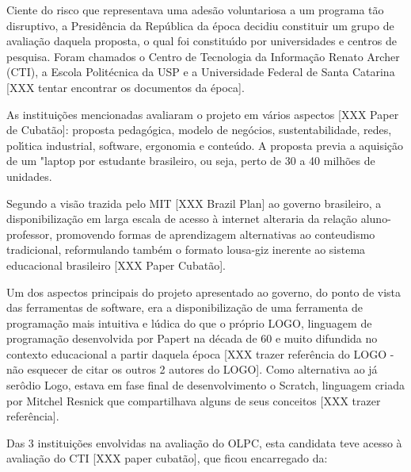 \documentclass[
12pt,		%
openright,	%
twoside,  %
a4paper,			%
chapter=TITLE,		%
english,			%
french,				%
spanish,			%
brazil				%
]{USPSC-classe/USPSC}
\begin{document}
Ciente do risco que representava uma ades\~ao voluntariosa a um programa t\~ao disruptivo, a Presid\^encia da Rep\'ublica da \'epoca decidiu constituir um grupo de avalia\c{c}\~ao  daquela proposta, o  qual foi constitu\'{\i}do por universidades e centros de pesquisa. Foram chamados o Centro de Tecnologia da Informa\c{c}\~ao Renato Archer (CTI), a Escola Polit\'ecnica da USP e a Universidade Federal de Santa Catarina [XXX tentar encontrar os documentos da \'epoca]. 




As institui\c{c}\~oes mencionadas avaliaram o projeto em v\'arios aspectos [XXX Paper de Cubat\~ao]: proposta pedag\'ogica, modelo de neg\'ocios, sustentabilidade, redes, pol\'{\i}tica industrial, software, ergonomia e conte\'udo. A proposta previa a aquisi\c{c}\~ao de um "laptop por estudante brasileiro, ou seja, perto de 30 a 40 milh\~oes de unidades.




Segundo a vis\~ao trazida pelo MIT [XXX Brazil Plan] ao governo brasileiro, a disponibiliza\c{c}\~ao em larga escala de acesso \`a internet alteraria da rela\c{c}\~ao aluno-professor, promovendo formas de aprendizagem alternativas ao conteudismo tradicional, reformulando tamb\'em o formato lousa-giz inerente ao sistema educacional brasileiro [XXX Paper Cubat\~ao].




Um dos aspectos principais do projeto apresentado ao governo, do ponto de vista das ferramentas de software, era a disponibiliza\c{c}\~ao de uma ferramenta de programa\c{c}\~ao mais intuitiva e l\'udica do que o pr\'oprio LOGO, linguagem de programa\c{c}\~ao desenvolvida por Papert na d\'ecada de 60 e muito difundida no contexto educacional a partir daquela \'epoca [XXX trazer refer\^encia do LOGO - n\~ao esquecer de citar os outros 2 autores do LOGO]. Como alternativa ao j\'a ser\^odio Logo, estava em fase final de desenvolvimento o Scratch, linguagem criada por Mitchel Resnick que compartilhava alguns de seus conceitos [XXX trazer refer\^encia].




Das 3 institui\c{c}\~oes envolvidas na avalia\c{c}\~ao do OLPC, esta candidata  teve acesso \`a avalia\c{c}\~ao do CTI [XXX paper cubat\~ao], que ficou encarregado da:
\end{document}
